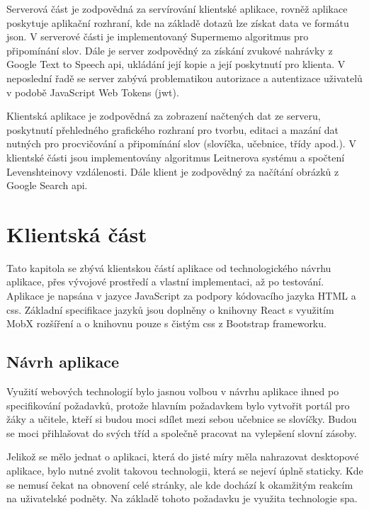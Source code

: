 \documentclass[a4paper,11pt,titlepage,fleqn]{article}
\begin{document}
        Serverová část je zodpovědná za servírování klientské aplikace, rovněž aplikace poskytuje aplikační rozhraní, kde na základě dotazů lze získat data ve formátu \gls{json}. V serverové části je implementovaný Supermemo algoritmus pro připomínání slov. Dále je server zodpovědný za získání zvukové nahrávky z Google Text to Speech \gls{api}, ukládání její kopie a její poskytnutí pro klienta. V neposlední řadě se server zabývá problematikou autorizace a autentizace uživatelů v podobě JavaScript Web Tokens (\gls{jwt}). 

        Klientská aplikace je zodpovědná za zobrazení načtených dat ze serveru, poskytnutí přehledného grafického rozhraní pro tvorbu, editaci a mazání dat nutných pro procvičování a připomínání slov (slovíčka, učebnice, třídy apod.). V klientské části jsou implementovány algoritmus Leitnerova systému a spočtení Levenshteinovy vzdálenosti. Dále klient je zodpovědný za načítání obrázků z Google Search \gls{api}.


\newpage
\section{Klientská část}
    
    Tato kapitola se zbývá klientskou částí aplikace od technologického návrhu aplikace, přes vývojové prostředí a vlastní implementaci, až po testování. Aplikace je napsána v jazyce JavaScript za podpory kódovacího jazyka HTML a \gls{css}. Základní specifikace jazyků jsou doplněny o knihovny React s využitím MobX rozšíření a o knihovnu pouze s čistým \gls{css} z Bootstrap frameworku.

    \subsection{Návrh aplikace}
        Využití webových technologií bylo jasnou volbou v návrhu aplikace ihned po specifikování požadavků, protože hlavním požadavkem bylo vytvořit portál pro žáky a učitele, kteří si budou moci sdílet mezi sebou učebnice se slovíčky. Budou se moci přihlašovat do svých tříd a společně pracovat na vylepšení slovní zásoby. 

        Jelikož se mělo jednat o aplikaci, která do jisté míry měla nahrazovat desktopové aplikace, bylo nutné zvolit takovou technologii, která se nejeví úplně staticky. Kde se nemusí čekat na obnovení celé stránky, ale kde dochází k okamžitým reakcím na uživatelské podněty. Na základě tohoto požadavku je využita technologie \gls{spa}.
\end{document}
